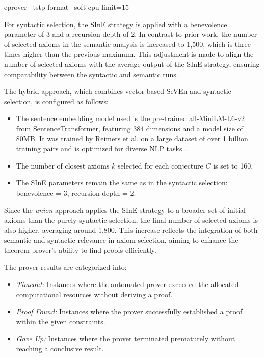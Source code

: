 \documentclass[english,version-2020-11]{uzl-thesis}
\begin{document}
\begin{Pseudocode}[morekeywords = {add, create}, deletekeywords={to}, numbers=left,
    caption = {Command to run Prover E}]
    eprover --tstp-format --soft-cpu-limit=15
\end{Pseudocode}

For syntactic selection, the SInE strategy is applied with a benevolence parameter of 3 and a recursion depth of 2. In contrast to prior work, the number of selected axioms in the semantic analysis is increased to 1,500, which is three times higher than the previous maximum. This adjustment is made to align the number of selected axioms with the average output of the SInE strategy, ensuring comparability between the syntactic and semantic runs.

The hybrid approach, which combines vector-based SeVEn and syntactic selection, is configured as follows:

\begin{itemize}
    \item The sentence embedding model used is the pre-trained all-MiniLM-L6-v2 from SentenceTransformer, featuring 384 dimensions and a model size of 80MB. It was trained by Reimers et al. on a large dataset of over 1 billion training pairs and is optimized for diverse NLP tasks \cite{Reimers2019, Sentencetransformers2019}.
    \item The number of closest axioms \( k \) selected for each conjecture \( C \) is set to 160.
    \item The SInE parameters remain the same as in the syntactic selection: benevolence = 3, recursion depth = 2.
\end{itemize}

Since the \textit{union} approach applies the SInE strategy to a broader set of initial axioms than the purely syntactic selection, the final number of selected axioms is also higher, averaging around 1,800. This increase reflects the integration of both semantic and syntactic relevance in axiom selection, aiming to enhance the theorem prover’s ability to find proofs efficiently.

The prover results are categorized into:
\begin{itemize}
    \item \textit{Timeout:} Instances where the automated prover exceeded the allocated computational resources without deriving a proof.
    \item \textit{Proof Found:} Instances where the prover successfully established a proof within the given constraints.
    \item \textit{Gave Up:} Instances where the prover terminated prematurely without reaching a conclusive result.
\end{itemize}
\end{document}
